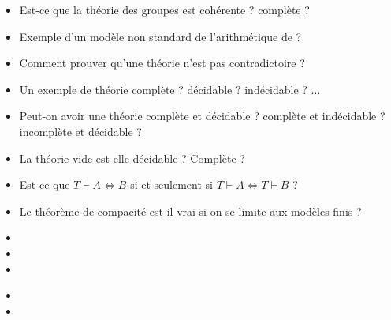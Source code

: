 \documentclass{agregfiche}
\begin{document}
\begin{itemize}
	\item Est-ce que la théorie des groupes est cohérente ? complète
	?
    \item Exemple d'un modèle non standard de l'arithmétique de
    ?
    \item Comment prouver qu'une théorie n'est pas contradictoire ?
    \item Un exemple de théorie complète ? décidable ? indécidable ?
    ...
    \item Peut-on avoir une théorie complète et décidable ? complète
    et indécidable ? incomplète et décidable ?
    \item La théorie vide est-elle décidable ? Complète ?
    \item  Est-ce que $T \vdash A \Leftrightarrow B$ si et seulement
    si $T
    \vdash A \Leftrightarrow T\vdash B$ ?
  \item Le théorème de compacité est-il vrai si on se limite aux modèles finis ?
\end{itemize}

\secreferences

\begin{itemize}
\item 
\item 
\item 

\end{itemize}

\secdev

\begin{itemize}
\item 
\item 
\end{itemize}
\end{document}
